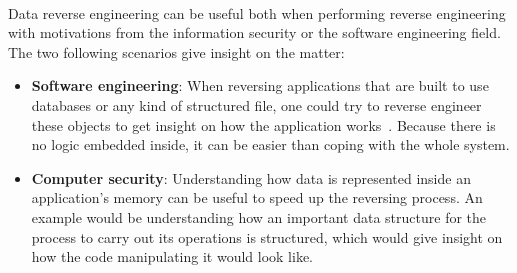 \paragraph{}
Data reverse engineering can be useful both when performing reverse engineering with motivations from the information security or the software engineering field. The two following scenarios give insight on the matter:
\begin{itemize}
	\item \textbf{Software engineering}: When reversing applications that are built to use databases or any kind of structured file, one could try to reverse engineer these objects to get insight on how the application works~\cite{hainaut1996database}. Because there is no logic embedded inside, it can be easier than coping with the whole system.
	\item \textbf{Computer security}: Understanding how data is represented inside an application's memory can be useful to speed up the reversing process. An example would be understanding how an important data structure for the process to carry out its operations is structured, which would give insight on how the code manipulating it would look like.
\end{itemize}
